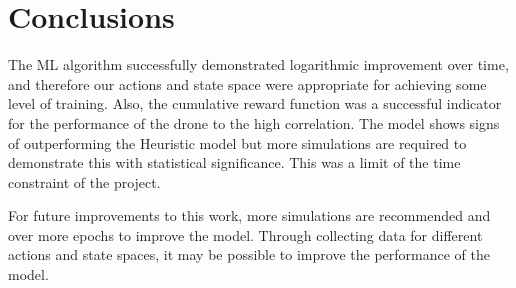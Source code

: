 \section{Conclusions}

The ML algorithm successfully demonstrated logarithmic improvement over time, and therefore our actions and state space were appropriate for achieving some level of training.
Also, the cumulative reward function was a successful indicator for the performance of the drone to the high correlation.
The model shows signs of outperforming the Heuristic model but more simulations are required to demonstrate this with statistical significance. This was a limit of the time constraint of the project.


For future improvements to this work, more simulations are recommended and over more epochs to improve the model.
Through collecting data for different actions and state spaces, it may be possible to improve the performance of the model.
